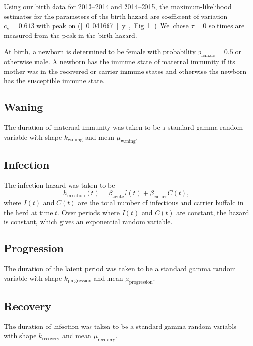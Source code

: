 \documentclass[12pt, USenglish]{article}  %
\begin{document}
Using our birth data for 2013–2014 and 2014–2015, the
maximum-likelihood estimates for the parameters of the birth hazard
are coefficient of variation $c_{\mathrm{v}} = 0.613$ with peak on
{\printyearoff{}} (\unit[0.041667]{y}, Fig.~1). We
chose $\tau = 0$ so times are measured from the peak in the birth
hazard.

At birth, a newborn is determined to be female with probability
$p_{\text{female}} = 0.5$ or otherwise male. A newborn has the immune
state of maternal immunity if its mother was in the recovered or
carrier immune states and otherwise the newborn has the susceptible
immune state.


\subsection{Waning}

The duration of maternal immunity was taken to be a standard gamma
random variable with shape $k_{\text{waning}}$
and mean $\mu_{\text{waning}}$.


\subsection{Infection}

The infection hazard was taken to be
\begin{equation}
  h_{\text{infection}}(t) = \beta_{\text{acute}} I(t) +
  \beta_{\text{carrier}} C(t),
\end{equation}
where $I(t)$ and $C(t)$ are the total number of infectious and carrier
buffalo in the herd at time $t$.  Over periods where $I(t)$ and $C(t)$
are constant, the hazard is constant, which gives an exponential
random variable.


\subsection{Progression}

The duration of the latent period was taken to be a standard gamma
random variable with shape $k_{\text{progression}}$
and mean $\mu_{\text{progression}}$.


\subsection{Recovery}

The duration of infection was taken to be a standard gamma random
variable with shape $k_{\text{recovery}}$ and mean
$\mu_{\text{recovery}}$.
\end{document}
